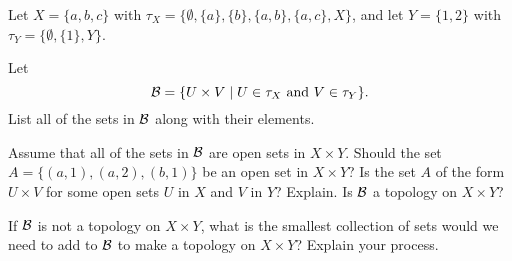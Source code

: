 \begin{pa} \label{PA:pd_top_1} Let $X = \{a,b,c\}$ with $\tau_X = \{\emptyset, \{a\}, \{b\}, \{a,b\}, \{a,c\}, X\}$, and let $Y = \{1,2\}$ with $\tau_Y = \{\emptyset, \{1\}, Y\}$. 
\be
\item Let 
\begin{equation} \label{eq:prod_basis}
\mathcal{B} = \{U \times V \mid U \in \tau_X \text{ and } V \in \tau_Y\}.
\end{equation}
List all of the sets in $\mathcal{B}$ along with their elements. 
 
\item Assume that all of the sets in $\mathcal{B}$ are open sets in $X \times Y$. Should the set $A = \{(a,1), (a,2), (b,1)\}$ be an open set in $X \times Y$? Is the set $A$ of the form $U \times V$ for some open sets $U$ in $X$ and $V$ in $Y$? Explain. Is $\mathcal{B}$ a topology on $X \times Y$? 

\item If $\mathcal{B}$ is not a topology on $X \times Y$, what is the smallest collection of sets would we need to add to $\mathcal{B}$ to make a topology on $X \times Y$? Explain your process. 

\ee

\end{pa}

